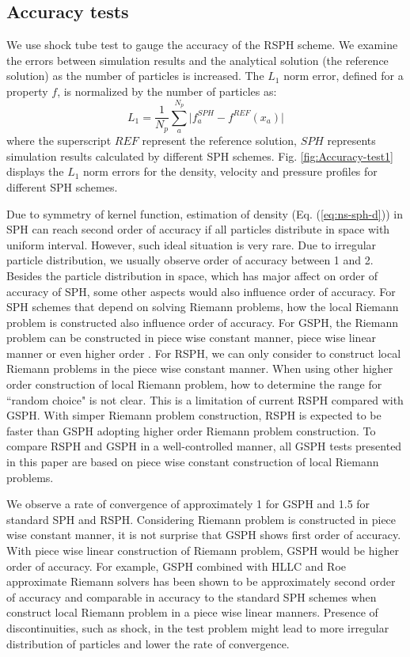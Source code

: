 \documentclass[preprint,12pt,authoryear]{elsarticle}
\begin{document}
\subsection{Accuracy tests}
We use shock tube test to gauge the accuracy of the RSPH scheme.
We examine the errors between simulation results and the analytical solution (the reference solution) as the number of particles is increased. The $L_1$ norm error, defined for a property $f$, is normalized by the number of particles as:
\begin{equation}
L_1= \frac{1}{N_p} \sum_a^{N_p} \vert f_a^{SPH} - f^{REF} (x_a) \vert 
\end{equation}
where the superscript $REF$ represent the reference solution, $SPH$ represents simulation results calculated by different SPH schemes. Fig. \ref{fig:Accuracy-test1} displays the $L_1$ norm errors for the density, velocity and pressure profiles for different SPH schemes.

Due to symmetry of kernel function, estimation of density (Eq. (\ref{eq:ns-sph-d})) in SPH can reach second order of accuracy if all particles distribute in space with uniform interval. However, such ideal situation is very rare. Due to irregular particle distribution, we usually observe order of accuracy between 1 and 2. Besides the particle distribution in space, which has major affect on order of accuracy of SPH, some other aspects would also influence order of accuracy. For SPH schemes that depend on solving Riemann problems, how the local Riemann problem is constructed also influence order of accuracy. 
For GSPH, the Riemann problem can be constructed in piece wise constant manner, piece wise linear manner or even higher order \citep{inutsuka2002reformulation}. For RSPH, we can only consider to construct local Riemann problems in the piece wise constant manner. When using other higher order construction of local Riemann problem, how to determine the range for ``random choice" is not clear. This is a limitation of current RSPH compared with GSPH. With simper Riemann problem construction, RSPH is expected to be faster than GSPH adopting higher order Riemann problem construction. To compare RSPH and GSPH in a well-controlled manner, all GSPH tests presented in this paper are based on piece wise constant construction of local Riemann problems.

We observe a rate of convergence of approximately 1 for GSPH and 1.5 for standard SPH and RSPH.  Considering Riemann problem is constructed in piece wise constant manner, it is not surprise that GSPH shows first order of accuracy. With piece wise linear construction of Riemann problem, GSPH would be higher order of accuracy. For example,
GSPH combined with HLLC and Roe approximate Riemann solvers has been shown to be approximately second order of accuracy \citep{puri2014comparison} and comparable in accuracy to the standard SPH schemes when construct local Riemann problem in a piece wise linear manners. Presence of discontinuities, such as shock, in the test problem might lead to more irregular distribution of particles and lower the rate of convergence. 
\end{document}
